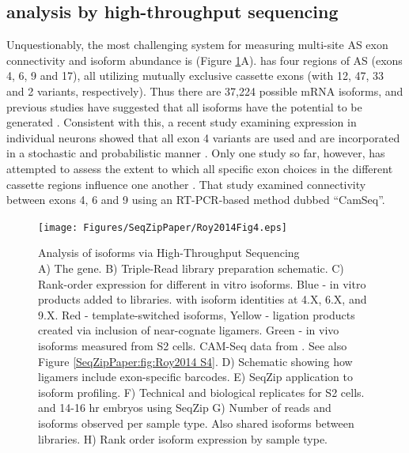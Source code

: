	\subsection{\dscam{} analysis by high-throughput sequencing}
		\label{SeqZipPaper:subsec:Dscam SeqZip Controls}

		Unquestionably, the most challenging system for measuring multi-site AS exon connectivity and isoform abundance is \dscam{} (Figure \ref{SeqZipPaper:fig:Roy2014 F4}A). \dscam{} has four regions of AS (exons 4, 6, 9 and 17), all utilizing mutually exclusive cassette exons (with 12, 47, 33 and 2 variants, respectively). Thus there are 37,224 possible \dscam{} mRNA isoforms, and previous studies have suggested that all isoforms have the potential to be generated \citep{Neves2004,Zhan2004,Sun2013}. Consistent with this, a recent study examining \dscam{} expression in individual neurons showed that all exon 4 variants are used and are incorporated in a stochastic and probabilistic manner \citep{Miura2013b}. Only one study so far, however, has attempted to assess the extent to which all specific exon choices in the different cassette regions influence one another \citep{Sun2013}. That study examined connectivity between exons 4, 6 and 9 using an RT-PCR-based method dubbed ``CamSeq''.

		\begin{figure} %
			\centering 
			\texttt{[image: Figures/SeqZipPaper/Roy2014Fig4.eps]}
			\caption[Analysis of \dscam{} isoforms via High-Throughput Sequencing]
			{ 
				Analysis of \dscam{} isoforms via High-Throughput Sequencing\\
				A) The \dscam{} gene. B) Triple-Read library preparation schematic. C) Rank-order expression for different in vitro \dscam{} isoforms. Blue - in vitro products added to libraries. with isoform identities at 4.X, 6.X, and 9.X. Red - template-switched isoforms, Yellow - ligation products created via inclusion of near-cognate ligamers. Green - in vivo isoforms measured from S2 cells. CAM-Seq data from \citep{Sun2013}. See also Figure \ref{SeqZipPaper:fig:Roy2014 S4}. D) Schematic showing how ligamers include exon-specific barcodes. E) SeqZip application to \dscam{} isoform profiling. F) Technical and biological replicates for S2 cells. and 14-16 hr embryos using SeqZip G) Number of reads and isoforms observed per sample type. Also shared isoforms between libraries. H) Rank order isoform expression by sample type.
				}
			\label{SeqZipPaper:fig:Roy2014 F4}
			\end{figure}

